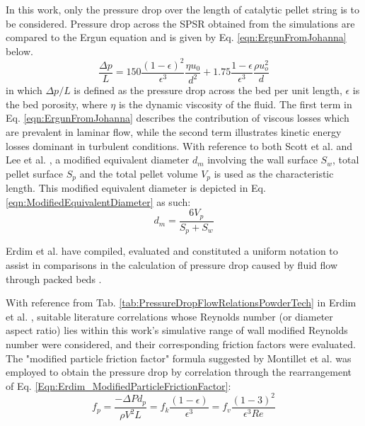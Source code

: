 In this work, only the pressure drop over the length of catalytic pellet string is to be considered. Pressure drop across the SPSR obtained from the simulations are compared to the Ergun equation and is given by Eq. \ref{eqn:ErgunFromJohanna} below.
\begin{equation}\label{eqn:ErgunFromJohanna}
	\frac{\Delta p}{L} = 150\frac{(1-\epsilon)^2}{\epsilon^3}\frac{\eta u_0}{d^2}+1.75\frac{1-\epsilon}{\epsilon^3}\frac{\rho u_o^2}{d}
\end{equation}
in which ${\Delta p}/{L}$ is defined as the pressure drop across the bed per unit length, $\epsilon$ is the bed porosity, where $\eta$ is the dynamic viscosity of the fluid. The first term in Eq. \ref{eqn:ErgunFromJohanna} describes the contribution of viscous losses which are prevalent in laminar flow, while the second term illustrates kinetic energy losses dominant in turbulent conditions.
With reference to both Scott et al. and Lee et al. \cite{Scott1974,Lee1984}, a modified equivalent diameter $d_m$ involving the wall surface $S_w$, total pellet surface $S_p$ and the total pellet volume $V_p$ is used as the characteristic length. This modified equivalent diameter is depicted in Eq. \ref{eqn:ModifiedEquivalentDiameter} as such:
\begin{equation}\label{eqn:ModifiedEquivalentDiameter}
d_m = \frac{6V_p}{S_p+S_w}
\end{equation}

Erdim et al. have compiled, evaluated and constituted a uniform notation to assist in comparisons in the calculation of pressure drop caused by fluid flow through packed beds \cite{Erdim2015}.

With reference from Tab. \ref{tab:PressureDropFlowRelationsPowderTech} in Erdim et al. \cite{Erdim2015}, suitable literature correlations whose Reynolds number (or diameter aspect ratio) lies within this work's simulative range of wall modified Reynolds number were considered, and their corresponding friction factors were evaluated. The "modified particle friction factor" formula suggested by Montillet et al. \cite{Montillet2007} was employed to obtain the pressure drop by correlation through the rearrangement of Eq. \ref{Eqn:Erdim_ModifiedParticleFrictionFactor}:
\begin{equation}\label{Eqn:Erdim_ModifiedParticleFrictionFactor}
f_p = \frac{-\Delta P d_p}{\rho V^2 L} = f_k \frac{(1-\epsilon)}{\epsilon^3} = f_v \frac{(1-3)^2}{\epsilon^3 Re}
\end{equation}

